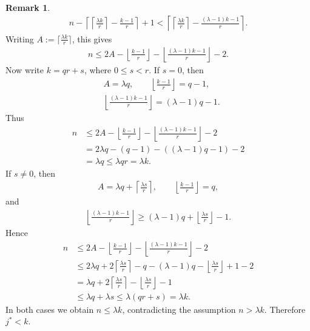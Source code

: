 \documentclass[conference, 10pt]{IEEEtran}
\theoremstyle{plain}
\theoremstyle{definition}
\newtheorem{remark}[definition]{Remark}
\begin{document}
\begin{remark}
\begin{align*}
    n-\left\lceil
        \left\lceil \frac{\lambda k}{r}\right\rceil
        -\frac{k-1}{r}
    \right\rceil+1
    <
    \left\lceil
        \left\lceil \frac{\lambda k}{r}\right\rceil
        -\frac{(\lambda-1)k-1}{r}
    \right\rceil .
\end{align*}
Writing
$A:=\lceil \frac{\lambda k}{r}\rceil$,
this gives
\begin{align*}
    n
    \le
    2A
    -\left\lfloor \frac{k-1}{r}\right\rfloor
    -\left\lfloor \frac{(\lambda-1)k-1}{r}\right\rfloor
    -2 .
\end{align*}
Now write $k=qr+s$, where $0\le s<r$.
If $s=0$, then
\begin{align*}
    &A=\lambda q, \qquad
    \left\lfloor \frac{k-1}{r}\right\rfloor=q-1,\\
    &\left\lfloor \frac{(\lambda-1)k-1}{r}\right\rfloor=(\lambda-1)q-1.
\end{align*}
Thus
\begin{align*}
    n
    &\le
    2A
    -\left\lfloor \frac{k-1}{r}\right\rfloor
    -\left\lfloor \frac{(\lambda-1)k-1}{r}\right\rfloor
    -2\\ 
    &=2\lambda q-(q-1)-((\lambda-1)q-1)-2 \\
    &=\lambda q
    \le \lambda qr
    =\lambda k .
\end{align*}
If $s\ne 0$, then
\begin{align*}
    A=\lambda q+\left\lceil \frac{\lambda s}{r}\right\rceil,
    \qquad
    \left\lfloor \frac{k-1}{r}\right\rfloor=q,
\end{align*}
and
\begin{align*}
    \left\lfloor \frac{(\lambda-1)k-1}{r}\right\rfloor
    \ge
    (\lambda-1)q+\left\lfloor \frac{\lambda s}{r}\right\rfloor-1.
\end{align*}
Hence
\begin{align*}
    n
    &\le
    2A
    -\left\lfloor \frac{k-1}{r}\right\rfloor
    -\left\lfloor \frac{(\lambda-1)k-1}{r}\right\rfloor
    -2 \\
    &\le
    2\lambda q
    +2\left\lceil \frac{\lambda s}{r}\right\rceil
    -q-(\lambda-1)q
    -\left\lfloor \frac{\lambda s}{r}\right\rfloor
    +1-2 \\
    &=
    \lambda q
    +2\left\lceil \frac{\lambda s}{r}\right\rceil
    -\left\lfloor \frac{\lambda s}{r}\right\rfloor
    -1 \\
    &\le
    \lambda q+\lambda s
    \le
    \lambda(qr+s)
    =\lambda k .
\end{align*}
In both cases we obtain $n\le \lambda k$, contradicting the assumption $n>\lambda k$. Therefore $j^*<k$.


\end{remark}
\end{document}
